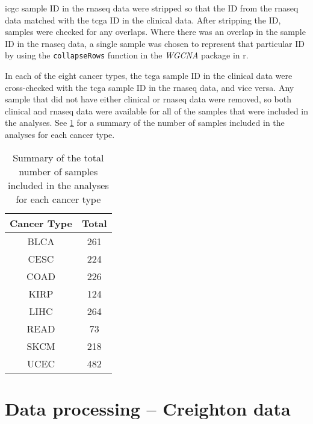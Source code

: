 
\gls{icgc} sample ID in the \gls{rnaseq} data were stripped so that the ID from the \gls{rnaseq} data matched with the \gls{tcga} ID in the clinical data.
After stripping the ID, samples were checked for any overlaps.
Where there was an overlap in the sample ID in the \gls{rnaseq} data, a single sample was chosen to represent that particular ID by using the \texttt{collapseRows} function in the \textit{WGCNA} package in \gls{r}.

In each of the eight cancer types, the \gls{tcga} sample ID in the clinical data were cross-checked with the \gls{tcga} sample ID in the \gls{rnaseq} data, and vice versa.
Any sample that did not have either clinical or \gls{rnaseq} data were removed, so both clinical and \gls{rnaseq} data were available for all of the samples that were included in the analyses.
See \cref{tab:samplesize} for a summary of the number of samples included in the analyses for each cancer type.

\begin{table}[h]
	\caption{Summary of the total number of samples included in the analyses for each cancer type}
	\label{tab:samplesize}
	\begin{center}
		\begin{tabular}{cc}
			\textbf{Cancer Type}   & \textbf{Total} \\
			\hline
			\rule{0pt}{2.25ex}BLCA & 261   \\
			CESC                   & 224   \\
			COAD                   & 226   \\
			KIRP                   & 124   \\
			LIHC                   & 264   \\
			READ                   & 73    \\
			SKCM                   & 218   \\
			UCEC                   & 482   \\
		\end{tabular}
	\end{center}
\end{table}

\section{Data processing -- Creighton data}
\label{sec:dataprocessingcr}

